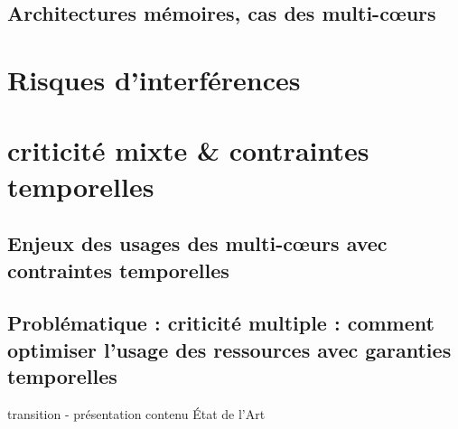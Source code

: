 \documentclass[french, a4paper, 11pt, twoside, pdftex]{StyleThese}
\begin{document}
    \subsection{Architectures mémoires, cas des multi-c\oe{}urs}
\section{Risques d'interférences}
\section{criticité mixte \& contraintes temporelles}
    \subsection{Enjeux des usages des multi-c\oe{}urs avec contraintes temporelles}
    \subsection{Problématique :  criticité multiple : comment optimiser l'usage des ressources avec garanties temporelles}
transition - présentation contenu État de l'Art


\ifdefined{}
\else


\end{document}
